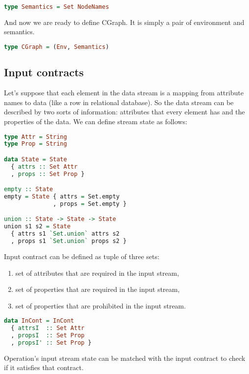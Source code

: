 \begin{lstlisting}[language=Haskell]
type Semantics = Set NodeNames
\end{lstlisting}

And now we are ready to define CGraph.
It is simply a pair of environment and semantics.

\begin{lstlisting}[language=Haskell]
type CGraph = (Env, Semantics)
\end{lstlisting}

\subsection{Input contracts}

Let's suppose that each element in the data stream is a mapping from attribute names to data (like a row in relational database).
So the data stream can be described by two sorts of information: attributes that every element has and the properties of the data.
We can define stream state as follows:

\begin{lstlisting}[language=Haskell]
type Attr = String
type Prop = String

data State = State
  { attrs :: Set Attr
  , props :: Set Prop }

empty :: State
empty = State { attrs = Set.empty
              , props = Set.empty }

union :: State -> State -> State
union s1 s2 = State
  { attrs s1 `Set.union` attrs s2
  , props s1 `Set.union` props s2 }
\end{lstlisting}

Input contract can be defined as tuple of three sets:
\begin{enumerate}
    \item set of attributes that are required in the input stream,
    \item set of properties that are required in the input stream,
    \item set of properties that are prohibited in the input stream.
\end{enumerate}

\begin{lstlisting}[language=Haskell]
data InCont = InCont
  { attrsI  :: Set Attr
  , propsI  :: Set Prop
  , propsI' :: Set Prop }
\end{lstlisting}

Operation's input stream state can be matched with the input contract to check if it satisfies that contract.

